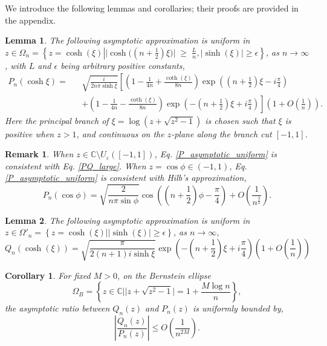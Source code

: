\documentclass[11pt]{article}
\newtheorem{remark}{Remark}
\newtheorem{corollary}{Corollary}
\newtheorem{lemma}{Lemma}
\begin{document}
We introduce the following lemmas and corollaries; their proofs are provided in the appendix.
\begin{lemma} \label{lemma_P_uniform}
    The following asymptotic approximation is uniform in $\displaystyle z \in \Omega_n = \left\{  z = \cosh(\xi) \left| \bigl|\cosh\!\bigl((n+\tfrac{1}{2})\xi\bigr)\bigr| \;\geq\; \frac{L}{n}, |\sinh(\xi)| \geq \epsilon\right\} \right.$, as $n \to \infty$, with $L$ and $\epsilon$ being arbitrary positive constants,
    \begin{eqnarray}
    P_n(\cosh \xi) =&& \sqrt{\frac{i}{2n\pi \sinh \xi}}\left[\left(1 - \frac{1}{4n} + \frac{\coth(\xi)}{8n}\right)\exp\left((n+\frac{1}{2})\xi-i\frac{\pi}{4}\right) \right. \nonumber\\
    && \left.  + \left(1 - \frac{1}{4n} - \frac{\coth(\xi)}{8n}\right)\exp\left(-(n+\frac{1}{2})\xi+i\frac{\pi}{4}\right)\right] \left( 1 + O(\frac{1}{n}) \right). \label{P_asymptotic_uniform}
\end{eqnarray}
Here the principal branch of $\xi = \log(z + \sqrt{z^2-1})$ is chosen such that $\xi$ is positive when $z>1$, and continuous on the $z$-plane along the branch cut $[-1,1]$.
\end{lemma}

\begin{remark}
    When $ z \in \mathbb{C} \setminus U_\varepsilon([-1,1]) $, Eq. \eqref{P_asymptotic_uniform} is consistent with Eq. \eqref{PQ_large}. When $z= \cos \phi \in (-1,1)$, Eq. \eqref{P_asymptotic_uniform} is consistent with Hilb's approximation,
    \begin{equation}
    \displaystyle P_n(\cos \phi) = \sqrt{\frac{2}{n \pi \sin \phi }}\cos\left( (n+\frac{1}{2})\phi -  \frac{\pi}{4} \right)  + O(\frac{1}{n^{\frac{3}{2}}}). \label{P_real}
\end{equation}
\end{remark}
\begin{lemma}
The following asymptotic approximation is uniform in $\displaystyle z \in \Omega'_n = \left\{  z = \cosh(\xi) \left| |\sinh(\xi)| \geq \epsilon\right\} \right.$, as $n \to \infty$,
    \begin{equation}
    Q_n(\cosh(\xi)) = \sqrt{\frac{\pi}{2(n+1)i \sinh \xi}}\exp\left(-(n+\frac{1}{2})\xi+i\frac{\pi}{4}\right)  \left( 1 + O(\frac{1}{n}) \right) \label{Q_asymptotic_uniform}
\end{equation}
\end{lemma}

\begin{corollary} \label{Q_P_ratio_bernstein}
    For fixed $M>0$, on the Bernstein ellipse
\begin{equation}
    \Omega_B = \left\{ z \in \mathbb{C} \Big| \big| z + \sqrt{z^2 - 1} \big| = 1 + \frac{M \log n}{n}\right\},
\end{equation}
the asymptotic ratio between $Q_n(z)$ and $P_n(z)$ is uniformly bounded by,
    \begin{equation}
        \left|\frac{Q_n(z)}{P_n(z)} \right| \leq O(\frac{1}{n^{2M}}).
    \end{equation} 
\end{corollary}
\end{document}
